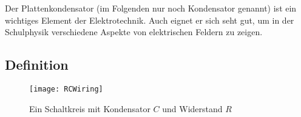 




%
%	





Der Plattenkondensator (im Folgenden nur noch Kondensator genannt) ist ein wichtiges Element der Elektrotechnik. Auch eignet er sich seht gut, um in der Schulphysik verschiedene Aspekte von elektrischen Feldern zu zeigen.


\subsection{Definition} \label{subsec:kon_def}

\begin{figure}[h!]
	\centering
	\texttt{[image: RCWiring]}
	\caption{Ein Schaltkreis mit Kondensator $C$ und Widerstand $R$}
	\label{fig:CapWiring}
\end{figure}

